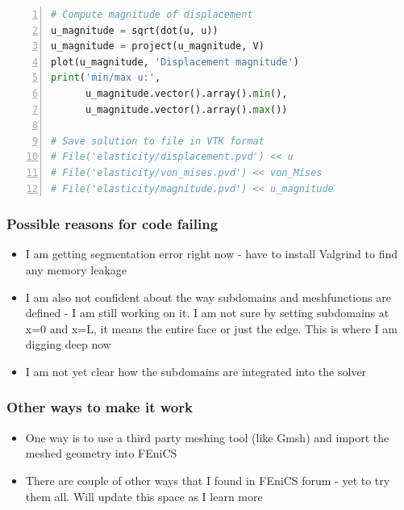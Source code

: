 \documentclass{beamer}
\begin{document}
\begin{frame}
\begin{lstlisting}[language=Python, basicstyle=\ttfamily\tiny,  keywordstyle=\color{blue},  numbers=left,  stepnumber=1, numbersep=10pt, tabsize=4, showspaces=false, showstringspaces=false]
# Compute magnitude of displacement
u_magnitude = sqrt(dot(u, u))
u_magnitude = project(u_magnitude, V)
plot(u_magnitude, 'Displacement magnitude')
print('min/max u:',
      u_magnitude.vector().array().min(),
      u_magnitude.vector().array().max())

# Save solution to file in VTK format
# File('elasticity/displacement.pvd') << u
# File('elasticity/von_mises.pvd') << von_Mises
# File('elasticity/magnitude.pvd') << u_magnitude

\end{lstlisting}
\end{frame}

 \begin{frame}[fragile]
\frametitle{Possible reasons for code failing}
\begin{itemize}
		\vfill
		\item{I am getting segmentation error right now - have to install Valgrind to find any memory leakage}
		\vfill
		\item{I am also not confident about the way subdomains and meshfunctions are defined - I am still working on it. I am not sure by setting subdomains at x=0 and x=L, it means the entire face or just the edge. This is where I am digging deep now}
		\vfill
		\item{I am not yet clear how the subdomains are integrated into the solver}
		\vfill
\end{itemize}
\end{frame}

 \begin{frame}
\frametitle{Other ways to make it work}
\begin{itemize}
		\vfill
		\item{One way is to use a third party meshing tool (like Gmsh) and import the meshed geometry into FEniCS}
		\vfill
		\item{There are couple of other ways that I found in FEniCS forum - yet to try them all. Will update this space as I learn more}
		\vfill
\end{itemize}
\end{frame}
\end{document}
